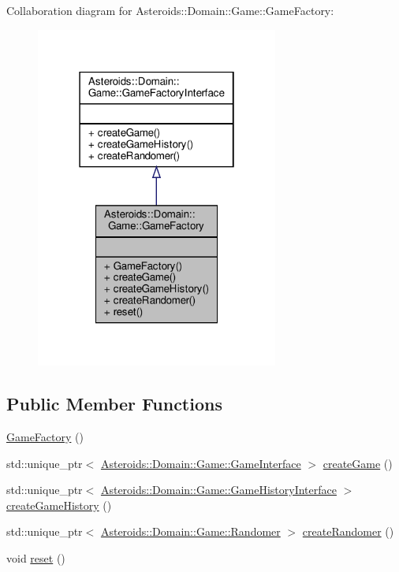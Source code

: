 Collaboration diagram for Asteroids\+:\+:Domain\+:\+:Game\+:\+:Game\+Factory\+:\nopagebreak
\begin{figure}[H]
\begin{center}
\leavevmode
\includegraphics[width=226pt]{classAsteroids_1_1Domain_1_1Game_1_1GameFactory__coll__graph}
\end{center}
\end{figure}
\subsection*{Public Member Functions}
\begin{DoxyCompactItemize}
\item 
\hyperlink{classAsteroids_1_1Domain_1_1Game_1_1GameFactory_a90ae7ac4ed8428b369c71b3dd17a9751}{Game\+Factory} ()
\item 
std\+::unique\+\_\+ptr$<$ \hyperlink{classAsteroids_1_1Domain_1_1Game_1_1GameInterface}{Asteroids\+::\+Domain\+::\+Game\+::\+Game\+Interface} $>$ \hyperlink{classAsteroids_1_1Domain_1_1Game_1_1GameFactory_a87ce9a05bdee942acbc9434d32749a76}{create\+Game} ()
\item 
std\+::unique\+\_\+ptr$<$ \hyperlink{classAsteroids_1_1Domain_1_1Game_1_1GameHistoryInterface}{Asteroids\+::\+Domain\+::\+Game\+::\+Game\+History\+Interface} $>$ \hyperlink{classAsteroids_1_1Domain_1_1Game_1_1GameFactory_a1433b01f9a0f1ed45920fd9fb86f50da}{create\+Game\+History} ()
\item 
std\+::unique\+\_\+ptr$<$ \hyperlink{classAsteroids_1_1Domain_1_1Game_1_1Randomer}{Asteroids\+::\+Domain\+::\+Game\+::\+Randomer} $>$ \hyperlink{classAsteroids_1_1Domain_1_1Game_1_1GameFactory_ab46d642aa48fd4de15a0de8d7a425f1d}{create\+Randomer} ()
\item 
void \hyperlink{classAsteroids_1_1Domain_1_1Game_1_1GameFactory_a9be2f29f1827928b0145ce42848c11b1}{reset} ()
\end{DoxyCompactItemize}


